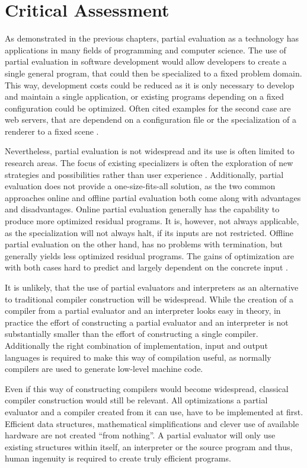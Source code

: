 
\section{Critical Assessment}\label{sec:discussion}

As demonstrated in the previous chapters, partial evaluation as a technology has applications in many fields of programming and computer science.
The use of partial evaluation in software development would allow developers to create a single general program, that could then be specialized to a fixed problem domain.
This way, development costs could be reduced as it is only necessary to develop and maintain a single application, or existing programs depending on a fixed configuration could be optimized.
Often cited examples for the second case are web servers, that are dependend on a configuration file or the specialization of a renderer to a fixed scene \citationneeded[Sestoft].

Nevertheless, partial evaluation is not widespread and its use is often limited to research areas.
The focus of existing specializers is often the exploration of new strategies and possibilities rather than user experience \citationneeded[].
Additionally, partial evaluation does not provide a one-size-fits-all solution, as the two common approaches online and offline partial evaluation both come along with advantages and disadvantages.
Online partial evaluation generally has the capability to produce more optimized residual programs.
It is, however, not always applicable, as the specialization will not always halt, if its inputs are not restricted.
Offline partial evaluation on the other hand, has no problems with termination, but generally yields less optimized residual programs.
The gains of optimization are with both cases hard to predict and largely dependent on the concrete input .

It is unlikely, that the use of partial evaluators and interpreters as an alternative to traditional compiler construction will be widespread.
While the creation of a compiler from a partial evaluator and an interpreter looks easy in theory, in practice the effort of constructing a partial evaluator and an interpreter is not substantially smaller than the effort of constructing a single compiler.
Additionally the right combination of implementation, input and output languages is required to make this way of compilation useful, as normally compilers are used to generate low-level machine code.

Even if this way of constructing compilers would become widespread, classical compiler construction would still be relevant.
All optimizations a partial evaluator and a compiler created from it can use, have to be implemented at first.
Efficient data structures, mathematical simplifications and clever use of available hardware are not created \enquote{from nothing}.
A partial evaluator will only use existing structures within itself, an interpreter or the source program and thus, human ingenuity is required to create truly efficient programs.


